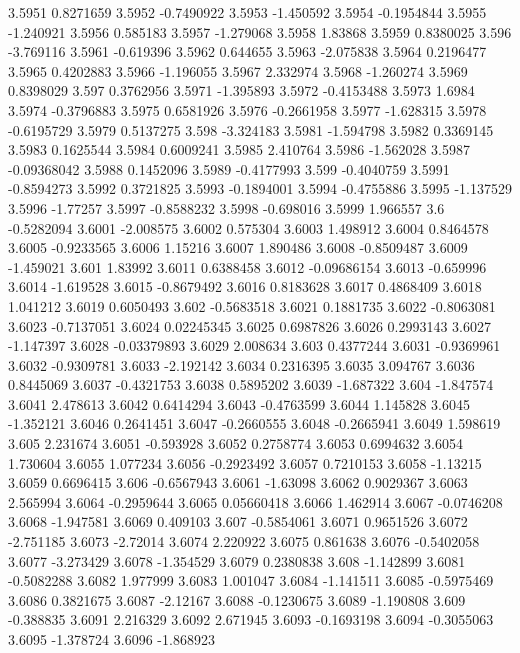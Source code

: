 3.5951  0.8271659
3.5952  -0.7490922
3.5953  -1.450592
3.5954  -0.1954844
3.5955  -1.240921
3.5956  0.585183
3.5957  -1.279068
3.5958  1.83868
3.5959  0.8380025
3.596  -3.769116
3.5961  -0.619396
3.5962  0.644655
3.5963  -2.075838
3.5964  0.2196477
3.5965  0.4202883
3.5966  -1.196055
3.5967  2.332974
3.5968  -1.260274
3.5969  0.8398029
3.597  0.3762956
3.5971  -1.395893
3.5972  -0.4153488
3.5973  1.6984
3.5974  -0.3796883
3.5975  0.6581926
3.5976  -0.2661958
3.5977  -1.628315
3.5978  -0.6195729
3.5979  0.5137275
3.598  -3.324183
3.5981  -1.594798
3.5982  0.3369145
3.5983  0.1625544
3.5984  0.6009241
3.5985  2.410764
3.5986  -1.562028
3.5987  -0.09368042
3.5988  0.1452096
3.5989  -0.4177993
3.599  -0.4040759
3.5991  -0.8594273
3.5992  0.3721825
3.5993  -0.1894001
3.5994  -0.4755886
3.5995  -1.137529
3.5996  -1.77257
3.5997  -0.8588232
3.5998  -0.698016
3.5999  1.966557
3.6  -0.5282094
3.6001  -2.008575
3.6002  0.575304
3.6003  1.498912
3.6004  0.8464578
3.6005  -0.9233565
3.6006  1.15216
3.6007  1.890486
3.6008  -0.8509487
3.6009  -1.459021
3.601  1.83992
3.6011  0.6388458
3.6012  -0.09686154
3.6013  -0.659996
3.6014  -1.619528
3.6015  -0.8679492
3.6016  0.8183628
3.6017  0.4868409
3.6018  1.041212
3.6019  0.6050493
3.602  -0.5683518
3.6021  0.1881735
3.6022  -0.8063081
3.6023  -0.7137051
3.6024  0.02245345
3.6025  0.6987826
3.6026  0.2993143
3.6027  -1.147397
3.6028  -0.03379893
3.6029  2.008634
3.603  0.4377244
3.6031  -0.9369961
3.6032  -0.9309781
3.6033  -2.192142
3.6034  0.2316395
3.6035  3.094767
3.6036  0.8445069
3.6037  -0.4321753
3.6038  0.5895202
3.6039  -1.687322
3.604  -1.847574
3.6041  2.478613
3.6042  0.6414294
3.6043  -0.4763599
3.6044  1.145828
3.6045  -1.352121
3.6046  0.2641451
3.6047  -0.2660555
3.6048  -0.2665941
3.6049  1.598619
3.605  2.231674
3.6051  -0.593928
3.6052  0.2758774
3.6053  0.6994632
3.6054  1.730604
3.6055  1.077234
3.6056  -0.2923492
3.6057  0.7210153
3.6058  -1.13215
3.6059  0.6696415
3.606  -0.6567943
3.6061  -1.63098
3.6062  0.9029367
3.6063  2.565994
3.6064  -0.2959644
3.6065  0.05660418
3.6066  1.462914
3.6067  -0.0746208
3.6068  -1.947581
3.6069  0.409103
3.607  -0.5854061
3.6071  0.9651526
3.6072  -2.751185
3.6073  -2.72014
3.6074  2.220922
3.6075  0.861638
3.6076  -0.5402058
3.6077  -3.273429
3.6078  -1.354529
3.6079  0.2380838
3.608  -1.142899
3.6081  -0.5082288
3.6082  1.977999
3.6083  1.001047
3.6084  -1.141511
3.6085  -0.5975469
3.6086  0.3821675
3.6087  -2.12167
3.6088  -0.1230675
3.6089  -1.190808
3.609  -0.388835
3.6091  2.216329
3.6092  2.671945
3.6093  -0.1693198
3.6094  -0.3055063
3.6095  -1.378724
3.6096  -1.868923
